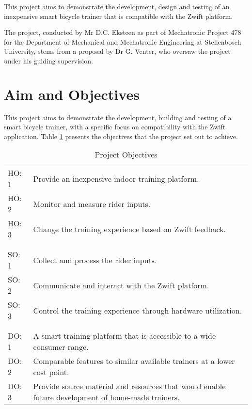 This project aims to demonstrate the development, design and testing of an inexpensive smart bicycle trainer that is compatible with the Zwift platform.

The project, conducted by Mr D.C. Eksteen as part of Mechatronic Project 478 for the Department of Mechanical and Mechatronic Engineering at Stellenbosch University, stems from a proposal by Dr G. Venter, who oversaw the project under his guiding supervision.

\section{Aim and Objectives}

This project aims to demonstrate the development, building and testing of a smart bicycle trainer, with a specific focus on compatibility with the Zwift application. Table \ref{tab:obj} presents the objectives that the project set out to achieve.

\begin{table}[H]
	\centering
	\caption{Project Objectives}
	\begin{tabularx}{\textwidth}{>{\centering}p{1.5cm} X}
		\toprule
		\multicolumn{2}{c}{Hardware Objectives}                                       \\
		\midrule
		HO: 1 & Provide an inexpensive indoor training platform.                       \\
		HO: 2 & Monitor and measure rider inputs.                                      \\
		HO: 3 & Change the training experience based on Zwift feedback.                \\
		      &                                                                       \\
		\toprule
		\multicolumn{2}{c}{Software Objectives}                                       \\
		\midrule
		SO: 1 & Collect and process the rider inputs.                                  \\
		SO: 2 & Communicate and interact with the Zwift platform.                          \\
		SO: 3 & Control the training experience through hardware utilization.          \\
		      &                                                                       \\
		\toprule
		\multicolumn{2}{c}{Final Deliverable Objectives}                              \\
		\midrule
		DO: 1 & A smart training platform that is accessible to a wide consumer range.   \\
		DO: 2 & Comparable features to similar available trainers at a lower cost point. \\
		DO: 3 & Provide source material and resources that would enable future development of home-made trainers.\\
		\bottomrule
	\end{tabularx}
	\label{tab:obj}
\end{table}

